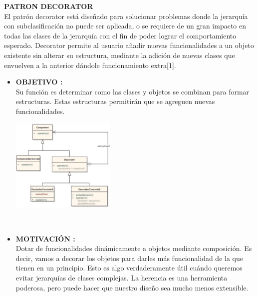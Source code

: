 \documentclass[twoside,twocolumn]{article}
\begin{document}
    \item \textbf{PATRON DECORATOR} \\
    El patrón decorator está diseñado para solucionar problemas donde la jerarquía con subclasificación no puede ser aplicada, o se requiere de un gran impacto en todas las clases de la jerarquía con el fin de poder lograr el comportamiento esperado. Decorator permite al usuario añadir nuevas funcionalidades a un objeto existente sin alterar su estructura, mediante la adición de nuevas clases que envuelven a la anterior dándole funcionamiento extra[1]. 
	\begin{itemize}
		\item \textbf{OBJETIVO :}	\\Su función es determinar como las clases y objetos se combinan para formar estructuras.
        Estas estructuras permitirán que se agreguen nuevas funcionalidades.
        
        \begin{center}
            \includegraphics[width=5cm]{./img/Imagen5.png} 
        \end{center}
        \\

		\item \textbf{MOTIVACIÓN  :} \\Dotar de funcionalidades dinámicamente a objetos mediante composición. Es decir, vamos a decorar los objetos para darles más funcionalidad de la que tienen en un principio.
        Esto es algo verdaderamente útil cuándo queremos evitar jerarquías de clases complejas. La herencia es una herramienta poderosa, pero puede hacer que nuestro diseño sea mucho menos extensible.
        


\end{itemize}
\end{document}

